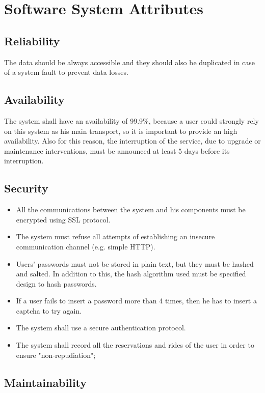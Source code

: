 \section{Software System Attributes}

\subsection{Reliability}
The data should be always accessible and they should also be duplicated in case
of a system fault to prevent data losses.

\subsection{Availability}
The system shall have an availability of 99.9\%, because a user could strongly rely on this system as his main transport, so it is important to provide an high availability. Also for this reason, the interruption of the service, due to upgrade or maintenance interventions, must be announced at least 5 days before its interruption. 

\subsection{Security}
\begin{itemize}
\item All the communications between the system and his components must be encrypted using SSL protocol.
\item The system must refuse all attempts of establishing an insecure communication channel (e.g. simple HTTP).
\item Users' passwords must not be stored in plain text, but they must be hashed and salted. In addition to this, the hash algorithm used must be specified design to hash passwords.
\item If a user fails to insert a password more than 4 times, then he has to insert a captcha to try again.
\item The system shall use a secure authentication protocol.
\item The system shall record all the reservations and rides of the user in order to ensure "non-repudiation";
\end{itemize}


\subsection{Maintainability}

